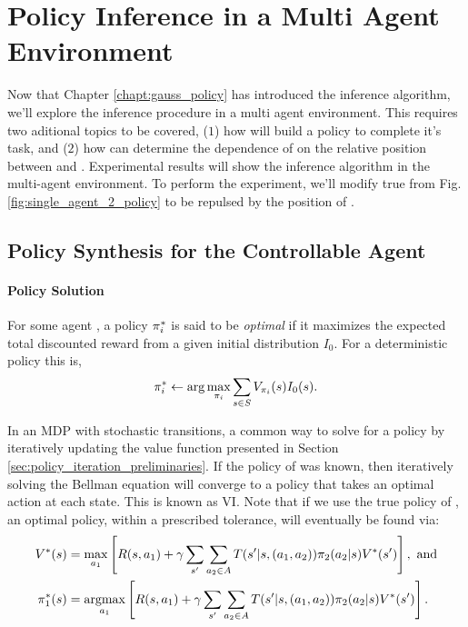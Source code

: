 \chapter{Policy Inference in a Multi Agent Environment}\label{chapt:multi_agent}

Now that Chapter \ref{chapt:gauss_policy} has introduced the inference algorithm, we'll explore the inference procedure in a multi agent environment. This requires two aditional topics to be covered, ($1$) how  will build a policy to complete it's task, and ($2$) how  can determine the dependence of  on the relative position between  and .  Experimental results will show the inference algorithm in the multi-agent environment. To perform the experiment, we'll modify true  from Fig. \ref{fig:single_agent_2_policy} to be repulsed by the position of . 

\section{Policy Synthesis for the Controllable Agent}\label{sec:preliminaries}




\subsubsection{Policy Solution}
For some agent , a policy $\pi_{i}^*$ is said to be \textit{optimal} if it maximizes the expected total discounted reward
from a given initial distribution $I_0$. For a deterministic policy this is,
\begin{equation}\label{eq:policy_hard_max}
\pi_{i}^* \leftarrow \arg\max_{\pi_{i}}\sum_{s\in S} V_{\pi_{i}}(s)I_0(s) .
\end{equation}

    In an \ac{MDP} with stochastic transitions, a common way to solve for a policy by iteratively updating the value function presented in Section
    \ref{sec:policy_iteration_preliminaries}. If the policy of  was known, then iteratively solving the Bellman
    equation \cite{hernandez2012adaptive} will converge to a policy that takes an optimal action at each state. This is known as
    \acf{VI}. Note that if we use the true policy of , an optimal policy, within a prescribed tolerance, will eventually be found via: 
    \begin{equation}\label{eq:bellman_true}
        \begin{aligned}
                V^*(s) &= \max_{a_1}\left[R(s,a_1) +
                    \gamma\sum_{s'}\sum_{a_2\in A}T(s'|s,(a_1,a_2))\pi_{2}(a_2|s) V^*(s')\right],\ \text{and}\\
                \pi_{1}^*(s) &= \mathop{\mathrm{argmax}}_{a_1}\left[R(s,a_1) +
                    \gamma\sum_{s'}\sum_{a_2\in A}T(s'|s,(a_1,a_2))\pi_{2}(a_2|s)V^*(s')\right].
        \end{aligned}
    \end{equation}

